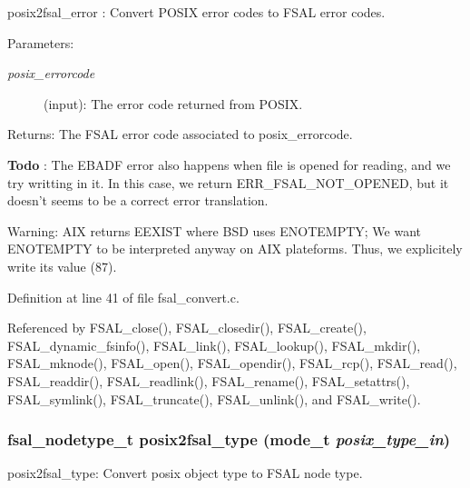 posix2fsal\_\-error : Convert POSIX error codes to FSAL error codes.

\begin{Desc}
\item[Parameters:]
\begin{description}
\item[{\em posix\_\-errorcode}](input): The error code returned from POSIX.\end{description}
\end{Desc}
\begin{Desc}
\item[Returns:]The FSAL error code associated to posix\_\-errorcode.\end{Desc}


\begin{Desc}
\item[{\bf Todo}]: The EBADF error also happens when file is opened for reading, and we try writting in it. In this case, we return ERR\_\-FSAL\_\-NOT\_\-OPENED, but it doesn't seems to be a correct error translation. \end{Desc}


\begin{Desc}
\item[Warning:]AIX returns EEXIST where BSD uses ENOTEMPTY; We want ENOTEMPTY to be interpreted anyway on AIX plateforms. Thus, we explicitely write its value (87). \end{Desc}


Definition at line 41 of file fsal\_\-convert.c.

Referenced by FSAL\_\-close(), FSAL\_\-closedir(), FSAL\_\-create(), FSAL\_\-dynamic\_\-fsinfo(), FSAL\_\-link(), FSAL\_\-lookup(), FSAL\_\-mkdir(), FSAL\_\-mknode(), FSAL\_\-open(), FSAL\_\-opendir(), FSAL\_\-rcp(), FSAL\_\-read(), FSAL\_\-readdir(), FSAL\_\-readlink(), FSAL\_\-rename(), FSAL\_\-setattrs(), FSAL\_\-symlink(), FSAL\_\-truncate(), FSAL\_\-unlink(), and FSAL\_\-write().
\subsubsection{\setlength{\rightskip}{0pt plus 5cm}fsal\_\-nodetype\_\-t posix2fsal\_\-type (mode\_\-t {\em posix\_\-type\_\-in})}\label{fsal__convert_8c_a7}


posix2fsal\_\-type: Convert posix object type to FSAL node type.

